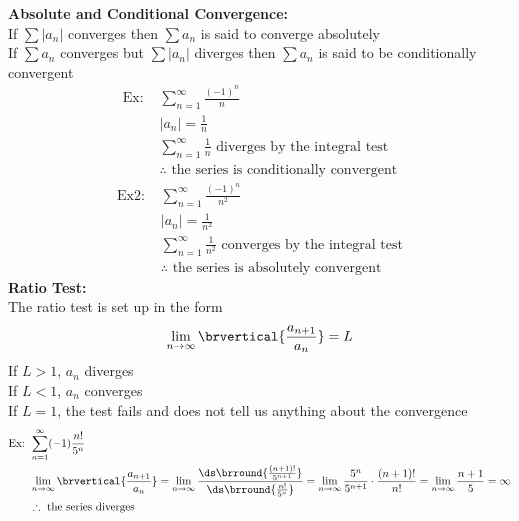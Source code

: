 \textbf{Absolute and Conditional Convergence:}\\
If $\sum|a_n|$ converges then $\sum a_n$ is said to converge absolutely\\
If $\sum a_n$ converges but $\sum|a_n|$ diverges then $\sum a_n$ is said to be conditionally convergent\\
\begin{align*}
    \text{Ex: }&\sum_{n=1}^\infty\frac{(-1)^n}{n}\\
    &|a_n|=\frac{1}{n}\\
    &\sum_{n=1}^\infty\frac{1}{n}\text{ diverges by the integral test}\\
    &\therefore\text{ the series is conditionally convergent}
\end{align*}
\begin{align*}
    \text{Ex2: }&\sum_{n=1}^\infty\frac{(-1)^n}{n^2}\\
    &|a_n|=\frac{1}{n^2}\\
    &\sum_{n=1}^\infty\frac{1}{n^2}\text{ converges by the integral test}\\
    &\therefore\text{ the series is absolutely convergent}
\end{align*}
\textbf{Ratio Test:}\\
The ratio test is set up in the form
$$\lim_{n\to\infty}\brvertical{\frac{a_{n+1}}{a_n}}=L$$
If $L>1$, $a_n$ diverges\\
If $L<1$, $a_n$ converges\\
If $L=1$, the test fails and does not tell us anything about the convergence
\begin{align*}
    \text{Ex: }&\sum_{n=1}^\infty(-1)\frac{n!}{5^n}\\
    &\lim_{n\to\infty}\brvertical{\frac{a_{n+1}}{a_n}}=\lim_{n\to\infty}\frac{\ds\brround{\frac{(n+1)!}{5^{n+1}}}}{\ds\brround{\frac{n!}{5^n}}}=\lim_{n\to\infty}\frac{5^n}{5^{n+1}}\cdot\frac{(n+1)!}{n!}=\lim_{n\to\infty}\frac{n+1}{5}=\infty\\
    &\therefore\text{ the series diverges}
\end{align*}


